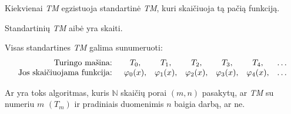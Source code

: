 \begin{prop}
  Kiekvienai \emph{TM} egzistuoja standartinė \emph{TM}, kuri skaičiuoja
  tą pačią funkciją.
\end{prop}

\begin{prop}
  Standartinių \emph{TM} aibė yra skaiti.
  \begin{note}
    Visas standartines \emph{TM} galima sunumeruoti:
    \[
    \begin{array}{r c c c c c l}
     \text{Turingo mašina: } & T_0, & T_1, & T_2, & T_3, & T_4, & \dotsc \\
     \text{Jos skaičiuojama funkcija: } & \varphi_0(x), & \varphi_1(x), &%
       \varphi_2(x), & \varphi_3(x), & \varphi_4(x), & \dotsc
      
    \end{array}
    \]
  \end{note}
\end{prop}

\begin{defn}
  Ar yra toks algoritmas, kuris $\mathbb{N}$ skaičių porai $(m,n)$ 
  pasakytų, ar \emph{TM} su numeriu $m$ $(T_m)$ ir pradiniais
  duomenimis $n$ baigia darbą, ar ne.
\end{defn}

